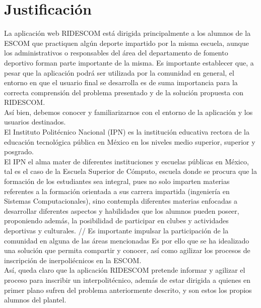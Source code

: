 	\section{Justificaci\'on}
	La aplicación web RIDESCOM está dirigida principalmente a los alumnos de la ESCOM que practiquen algún deporte impartido por la misma escuela, aunque los administrativos o responsables del área del departamento de fomento deportivo forman parte importante de la misma. Es importante establecer que, a pesar que la aplicación podrá ser utilizada por la comunidad en general,  el entorno en que el usuario final se desarrolla es de suma importancia para la correcta comprensión del problema presentado y de la solución propuesta con RIDESCOM.\\ 
	Así bien, debemos conocer y familiarizarnos con el entorno de la aplicación y los usuarios destinados. \\
	El Instituto Politécnico Nacional (IPN) es la institución educativa rectora de la educación tecnológica pública en México en los niveles medio superior, superior y posgrado. \cite{hist} \\
	
	El IPN el alma mater de diferentes instituciones y escuelas públicas en México, tal es el caso de la Escuela Superior de Cómputo, escuela donde se procura que la formación de los estudiantes sea integral, pues no solo imparten materias referentes a la formación orientada a sus carrera impartida (ingeniería en Sistemas Computacionales), sino contempla diferentes materias enfocadas a desarrollar diferentes aspectos y habilidades que los alumnos pueden poseer, proponiendo además, la posibilidad de participar en clubes y actividades deportivas y culturales. // 
	Es importante impulsar la participación de la comunidad en alguna de las áreas mencionadas 
	Es por ello que se ha idealizado una solución que permita compartir y conocer, así como agilizar los procesos de inscripción de inerpoliécnicos en la ESCOM.\\ %
	Así, queda claro que la aplicación RIDESCOM pretende informar y agilizar el proceso para inscribir un interpolitécnico, además de estar dirigida a quienes en primer plano sufren del problema anteriormente descrito, y son estos los propios alumnos del plantel.
	
